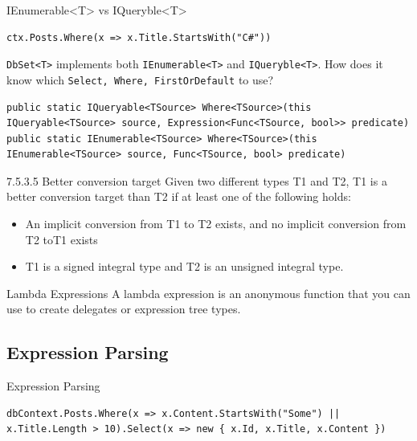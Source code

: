 \documentclass{bredelebeamer}
\begin{document}
\begin{frame}[fragile]{IEnumerable<T> vs IQueryble<T>}
    \begin{lstlisting}
ctx.Posts.Where(x => x.Title.StartsWith("C#"))
    \end{lstlisting}
    \lstinline{DbSet<T>} implements both \lstinline{IEnumerable<T>} and \lstinline{IQueryble<T>}.
    How does it know which \lstinline{Select, Where, FirstOrDefault} to use?
    \begin{lstlisting}
public static IQueryable<TSource> Where<TSource>(this IQueryable<TSource> source, Expression<Func<TSource, bool>> predicate)
public static IEnumerable<TSource> Where<TSource>(this IEnumerable<TSource> source, Func<TSource, bool> predicate)
    \end{lstlisting}
    \pause
    \begin{block}{7.5.3.5 Better conversion target}
        Given two different types T1 and T2, T1 is a better conversion target than T2 if at least one of the following holds:
        \begin{itemize}
            \item An implicit conversion from T1 to T2 exists, and no implicit conversion from T2 toT1 exists
            \item T1 is a signed integral type and T2 is an unsigned integral type.
        \end{itemize}
    \end{block}
    \begin{exampleblock}{Lambda Expressions}
        A lambda expression is an anonymous function that you can use to create delegates or expression tree types.
    \end{exampleblock}
\end{frame}
\subsection{Expression Parsing}
\begin{frame}[fragile]{Expression Parsing}
    \begin{lstlisting}
dbContext.Posts.Where(x => x.Content.StartsWith("Some") || x.Title.Length > 10).Select(x => new { x.Id, x.Title, x.Content })
    \end{lstlisting}
    \pause
    
\end{frame}
\end{document}
